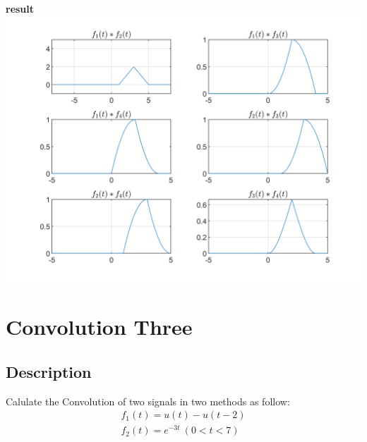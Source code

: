 \documentclass[UTF8,a4paper]{article}
\begin{document}
\textbf{result}\\
\includegraphics[scale=0.8]{T2.png}
\section{Convolution Three}
\subsection{Description}
Calulate the Convolution of two signals in two methods as follow:
$$
\begin{aligned}
    f_1(t)=u(t)-u(t-2)\\
    f_2(t)=e^{-3t} ~(0<t<7)
\end{aligned}
$$
\end{document}
